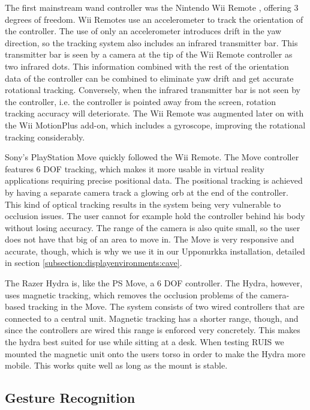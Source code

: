 \documentclass[12pt,a4paper,oneside,pdftex]{report}
\begin{document}
The first mainstream wand controller was the Nintendo Wii Remote \cite{WiiRemoteMain}, offering 3 degrees of freedom. Wii Remotes use an accelerometer to track the orientation of the controller. The use of only an accelerometer introduces drift in the yaw direction, so the tracking system also includes an infrared transmitter bar. This transmitter bar is seen by a camera at the tip of the Wii Remote controller as two infrared dots. This information combined with the rest of the orientation data of the controller can be combined to eliminate yaw drift and get accurate rotational tracking. Conversely, when the infrared transmitter bar is not seen by the controller, i.e. the controller is pointed away from the screen, rotation tracking accuracy will deteriorate. The Wii Remote was augmented later on with the Wii MotionPlus add-on, which includes a gyroscope, improving the rotational tracking considerably. 

Sony's PlayStation Move \cite{PSMoveMain} quickly followed the Wii Remote. The Move controller features 6 DOF tracking, which makes it more usable in virtual reality applications requiring precise positional data. The positional tracking is achieved by having a separate camera track a glowing orb at the end of the controller. This kind of optical tracking results in the system being very vulnerable to occlusion issues. The user cannot for example hold the controller behind his body without losing accuracy. The range of the camera is also quite small, so the user does not have that big of an area to move in. The Move is very responsive and accurate, though, which is why we use it in our Upponurkka installation, detailed in section \ref{subsection:displayenvironments:cave}.

The Razer Hydra is, like the PS Move, a 6 DOF controller. The Hydra, however, uses magnetic tracking, which removes the occlusion problems of the camera-based tracking in the Move. The system consists of two wired controllers that are connected to a central unit. Magnetic tracking has a shorter range, though, and since the controllers are wired this range is enforced very concretely. This makes the hydra best suited for use while sitting at a desk. When testing RUIS we mounted the magnetic unit onto the users torso in order to make the Hydra more mobile. This works quite well as long as the mount is stable. 

\subsection{Gesture Recognition}
\label{subsection:motion:gesture}
\end{document}
